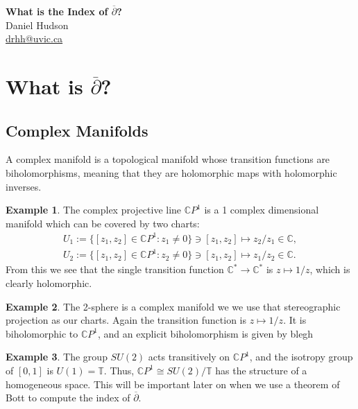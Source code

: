 \documentclass[12pt]{article}
\theoremstyle{definition}
\newtheorem{exam}{Example}[section]
\newcommand{\C}{\mathbb{C}}
\newcommand{\T}{\mathbb{T}}
\newcommand{\dolb}{\overline{\partial}}
\begin{document}
	\begin{center}
		\Large \textbf{What is the Index of $\dolb$?} \\
		
		\medskip
		\large Daniel Hudson \\ 
		\href{mailto:drhh@uvic.ca}{drhh@uvic.ca}
	\end{center}

\section{What is $\dolb$?}

\subsection{Complex Manifolds}

A complex manifold is a topological manifold whose transition functions are biholomorphisms, meaning that they are holomorphic maps with holomorphic inverses.

\begin{exam}
	The complex projective line $\C P^1$ is a 1 complex dimensional manifold which can be covered by two charts: 
		\begin{align*}
			U_1:=\{[z_1,z_2]\in \C P^1:z_1\neq 0\}\ni[z_1,z_2] \mapsto z_2/z_1\in \C, \\
			U_2:=\{[z_1,z_2]\in \C P^1:z_2\neq 0\}\ni[z_1,z_2] \mapsto z_1/z_2\in \C.
		\end{align*}
	From this we see that the single transition function $\C^*\to \C^*$ is $z\mapsto 1/z$, which is clearly holomorphic. 
\end{exam} 

\begin{exam}
	The 2-sphere is a complex manifold we we use that stereographic projection as our charts. Again the transition function is $z\mapsto 1/z$. It is biholomorphic to $\C P^1$, and an explicit biholomorphism is given by 
		blegh
\end{exam}

\begin{exam}
	The group $SU(2)$ acts transitively on $\C P^1$, and the isotropy group of $[0,1]$ is $U(1) = \T$. Thus, $\C P^1 \cong SU(2)/\T$ has the structure of a homogeneous space. This will be important later on when we use a theorem of Bott to compute the index of $\dolb$. 
\end{exam}
\end{document}
